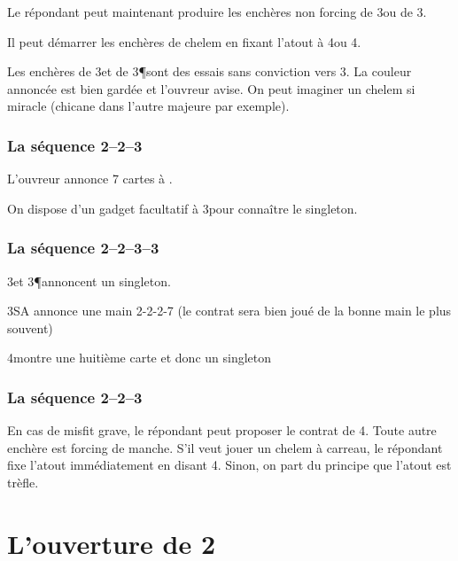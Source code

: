 \begin{multicols}{2}
 Le répondant peut maintenant produire les enchères non forcing de 3\T ou de 3\K.

 Il peut démarrer les enchères de chelem en fixant l'atout à 4\T ou 4\K.

 Les enchères de 3\C et de 3\P sont des essais sans conviction vers 3\NT. La couleur annoncée est bien gardée et l'ouvreur avise. On peut imaginer un chelem si miracle (chicane dans l'autre majeure par exemple).

 \subsection*{La séquence 2\T--2\K--3\T}

 L'ouvreur annonce 7 cartes à \T.

 On dispose d'un gadget facultatif à 3\K pour connaître le singleton.

 \subsection*{La séquence 2\T--2\K--3\T--3\K}

 3\C et 3\P annoncent un singleton.

 3SA annonce une main 2-2-2-7 (le contrat sera bien joué de la bonne main le plus souvent)

 4\T montre une huitième carte et donc un singleton \K

 \subsection*{La séquence 2\T--2\K--3\K}

 En cas de misfit grave, le répondant peut proposer le contrat de 4\T. Toute autre enchère est forcing de manche. S'il veut jouer un chelem à carreau, le répondant fixe l'atout immédiatement en disant 4\K. Sinon, on part du principe que l'atout est trèfle.

\end{multicols}


\chapter{L'ouverture de 2\K}

